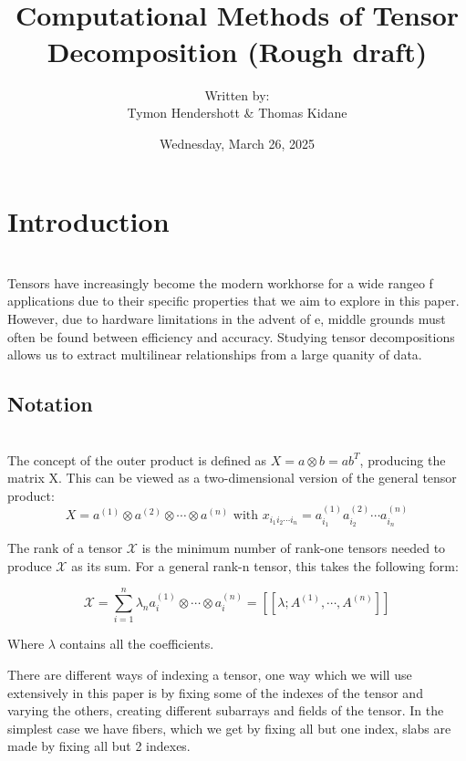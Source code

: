 \documentclass[11pt]{article}
\newcommand\0{\mathbf{0}}
\newcommand\<{\langle}
\renewcommand\>{\rangle}
\begin{document}


\title{\mbox{}\\[-8ex]Computational Methods of Tensor Decomposition (Rough draft)\\\normalsize}
\author{Written by: \\Tymon Hendershott \& Thomas Kidane\\[1ex]}
\date{Wednesday, March 26, 2025}

\maketitle

\tableofcontents

\noindent
\section{Introduction}\\
Tensors have increasingly become the modern workhorse for a wide rangeo f applications due to their specific properties that we aim to explore in this paper. However, due to hardware limitations in the advent of e, middle grounds must often be found between efficiency and accuracy. Studying tensor decompositions allows us to extract multilinear relationships from a large quanity of data.


\subsection{Notation}\\

The concept of the outer product is defined as $X=a\otimes b=ab^T$, producing the matrix X. This can be viewed as a two-dimensional version of the general tensor product:
$$X=a^{(1)}\otimes a^{(2)}\otimes\cdots\otimes a^{(n)}\text{ with } x_{i_1 i_2 \cdots i_n}=a^{(1)}_{i_1}a^{(2)}_{i_2}\cdots a^{(n)}_{i_n}$$

The rank of a tensor $\mathcal{X}$ is the minimum number of rank-one tensors needed to produce $\mathcal{X}$ as its sum. For a general rank-n tensor, this takes the following form:

$$\mathcal{X}=\sum_{i=1}^n \lambda_n a_i^{(1)} \otimes \cdots \otimes a_i^{(n)}=[[\lambda;A^{(1)},\cdots,A^{(n)}]]$$
    
Where $\lambda$ contains all the coefficients.

There are different ways of indexing a tensor, one way which we will use extensively in this paper is by fixing some of the indexes of the tensor and varying the others, creating different subarrays and fields of the tensor. In the simplest case we have fibers, which we get by fixing all but one index, slabs are made by fixing all but 2 indexes.
\end{document}
